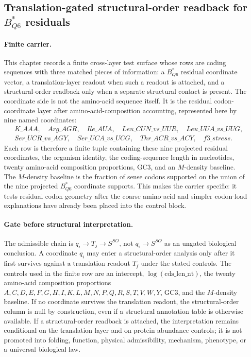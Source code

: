\subsection{Translation-gated structural-order readback for $B^{*}_{Q6}$ residuals}
\label{subsec:q6-translation-gated-structural-order-cross-layer}

\paragraph{Finite carrier.}
This chapter records a finite cross-layer test surface whose rows are coding sequences with three matched pieces of information: a $B^{*}_{Q6}$ residual coordinate vector, a translation-layer readout when such a readout is attached, and a structural-order readback only when a separate structural contact is present.  The coordinate side is not the amino-acid sequence itself.  It is the residual codon-coordinate layer after amino-acid-composition accounting, represented here by nine named coordinates:
$$
\begin{aligned}
&K\_AAA,\quad Arg\_AGR,\quad Ile\_AUA,\quad Leu\_CUN\_vs\_UUR,\quad Leu\_UUA\_vs\_UUG,\\
&Ser\_UCR\_vs\_AGY,\quad Ser\_UCA\_vs\_UCG,\quad Thr\_ACR\_vs\_ACY,\quad f3\_stress.
\end{aligned}
$$
Each row is therefore a finite tuple containing these nine projected residual coordinates, the organism identity, the coding-sequence length in nucleotides, twenty amino-acid composition proportions, GC3, and an $M$-density baseline.  The $M$-density baseline is the fraction of sense codons supported on the union of the nine projected $B^{*}_{Q6}$ coordinate supports.  This makes the carrier specific: it tests residual codon geometry after the coarse amino-acid and simpler codon-load explanations have already been placed into the control block.

\paragraph{Gate before structural interpretation.}
The admissible chain is $q_i \to T_j \to S^{SO}$, not $q_i \to S^{SO}$ as an ungated biological conclusion.  A coordinate $q_i$ may enter a structural-order analysis only after it first survives against a translation readout $T_j$ under the stated controls.  The controls used in the finite row are an intercept, $\log(\mathrm{cds\_len\_nt})$, the twenty amino-acid composition proportions $A,C,D,E,F,G,H,I,K,L,M,N,P,Q,R,S,T,V,W,Y$, GC3, and the $M$-density baseline.  If no coordinate survives the translation readout, the structural-order column is null by construction, even if a structural annotation table is otherwise available.  If a structural-order readback is attached, the interpretation remains conditional on the translation layer and on protein-abundance controls; it is not promoted into folding, function, physical admissibility, mechanism, phenotype, or a universal biological law.

